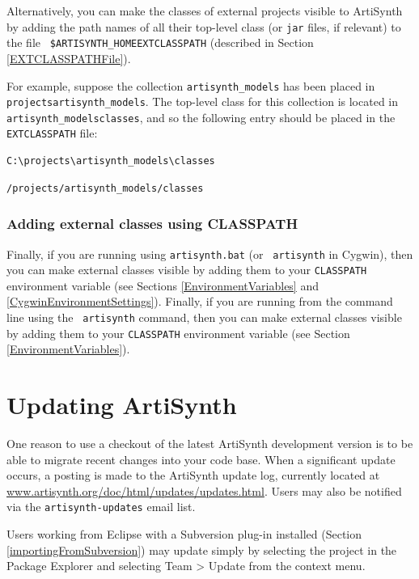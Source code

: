 Alternatively, you can make the classes of external projects visible
to ArtiSynth by adding the path names of all their top-level class
\directories (or {\tt jar} files, if relevant) to the file {\tt
\$ARTISYNTH\_HOME\SEP EXTCLASSPATH} (described in Section
\ref{EXTCLASSPATHFile}).

For example, suppose the collection {\tt artisynth\_models}
has been placed in {\tt \TOP projects\SEP artisynth\_models}.
The top-level class \directory for this collection is located
in {\tt artisynth\_models\SEP classes}, and so the following entry
should be placed in the {\tt EXTCLASSPATH} file:

\ifWindows
\begin{verbatim}
C:\projects\artisynth_models\classes
\end{verbatim}
\else
\begin{verbatim}
/projects/artisynth_models/classes
\end{verbatim}
\fi

\subsubsection{Adding external classes using CLASSPATH}

\ifWindows
Finally, if you are running using {\tt artisynth.bat} (or {\tt
artisynth} in Cygwin), then you can make external classes visible by
adding them to your {\tt CLASSPATH} environment variable (see Sections
\ref{EnvironmentVariables} and \ref{CygwinEnvironmentSettings}).
\else
Finally, if you are running from the command line using the {\tt
artisynth} command, then you can make external classes visible by adding
them to your {\tt CLASSPATH} environment variable (see Section
\ref{EnvironmentVariables}).
\fi

\section{Updating ArtiSynth}
\label{UpdatingArtiSynth}

One reason to use a checkout of the latest ArtiSynth
development version is to be able to migrate recent changes into your
code base. When a significant update occurs, a posting is made to the
ArtiSynth update log, currently located at
\href{http://www.artisynth.org/doc/html/updates/updates.html}
{www.artisynth.org/doc/html/updates/updates.html}.
Users may also be notified via the {\tt artisynth-updates} email list.

Users working from Eclipse with a Subversion plug-in installed
(Section \ref{importingFromSubversion}) may update simply by selecting
the project in the {\sf Package Explorer} and selecting {\sf Team >
Update} from the context menu.


